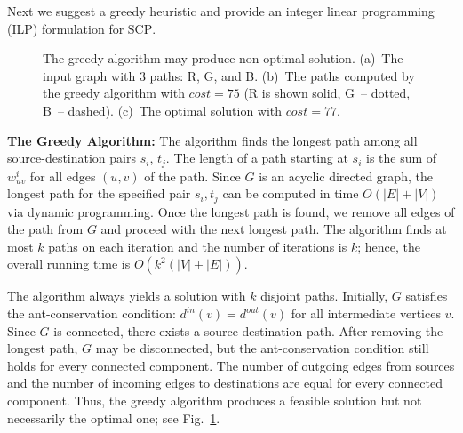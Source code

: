 \documentclass{llncs}
\newcommand{\SCoP}{\textsc{SCP}}
\begin{document}
Next we suggest a greedy heuristic and provide an integer linear programming (ILP) formulation for \SCoP{}.

\begin{figure}[t]
    \center
\hfill
\hfill
    \caption{The greedy algorithm may produce non-optimal solution.
    (a)~The input graph with 3 paths: R, G, and B.
    (b)~The paths computed by the greedy algorithm with $cost=75$
    (R is shown solid, G~-- dotted, B~-- dashed).
    (c)~The optimal solution with $cost=77$.}
    \label{fig:greedywrong}
\end{figure}

{\bf The Greedy Algorithm:}
The algorithm finds the longest path among all source-destination pairs $s_i$, $t_j$.
The length of a path starting
at $s_i$ is the sum of $w^i_{uv}$ for all edges $(u,v)$ of the path.
Since $G$ is an acyclic directed graph, the longest path for the
specified pair $s_i, t_j$ can be computed in time $O(|E|+|V|)$ via
dynamic programming. Once the longest path is found, we remove all
edges of the path from $G$ and proceed with the next longest path. The
algorithm finds at most $k$ paths on each iteration and the number of
iterations is $k$; hence, the overall running time is
$O(k^2(|V|+|E|))$.


The algorithm always yields a solution with $k$ disjoint paths.
Initially, $G$ satisfies the ant-conservation condition:
$d^{in}(v)=d^{out}(v)$ for all intermediate vertices $v$.
Since $G$ is connected, there exists a source-destination path. After removing the longest path, $G$
may be disconnected, but the ant-conservation condition still holds
for every connected component.
The number of outgoing edges from sources
and the number of incoming edges to destinations are equal for every
connected component.
Thus, the greedy algorithm produces a feasible solution but not necessarily the optimal one; see
Fig.~\ref{fig:greedywrong}.
\end{document}
